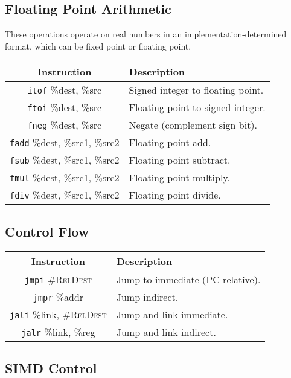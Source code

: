 \documentclass[10pt,letterpaper]{article}
\begin{document}
\subsection{Floating Point Arithmetic}
These operations operate on real numbers in an implementation-determined
format, which can be fixed point or floating point.

\begin{center}
\begin{tabular}{cl}
\textbf{Instruction}&\textbf{Description}\\
\hline
\texttt{itof} \%dest, \%src&Signed integer to floating point.\\
\texttt{ftoi} \%dest, \%src&Floating point to signed integer.\\
\texttt{fneg} \%dest, \%src&Negate (complement sign bit).\\
\texttt{fadd} \%dest, \%src1, \%src2&Floating point add.\\
\texttt{fsub} \%dest, \%src1, \%src2&Floating point subtract.\\
\texttt{fmul} \%dest, \%src1, \%src2&Floating point multiply.\\
\texttt{fdiv} \%dest, \%src1, \%src2&Floating point divide.\\
\end{tabular}
\end{center}

\subsection{Control Flow}

\begin{center}
\begin{tabular}{cl}
\textbf{Instruction}&\textbf{Description}\\
\hline
\texttt{jmpi} \textsc{\#RelDest}&Jump to immediate (PC-relative).\\
\texttt{jmpr} \%addr&Jump indirect.\\
\texttt{jali} \%link, \textsc{\#RelDest}&Jump and link immediate.\\
\texttt{jalr} \%link, \%reg&Jump and link indirect.\\
\end{tabular}
\end{center}

\subsection{SIMD Control}
\end{document}

